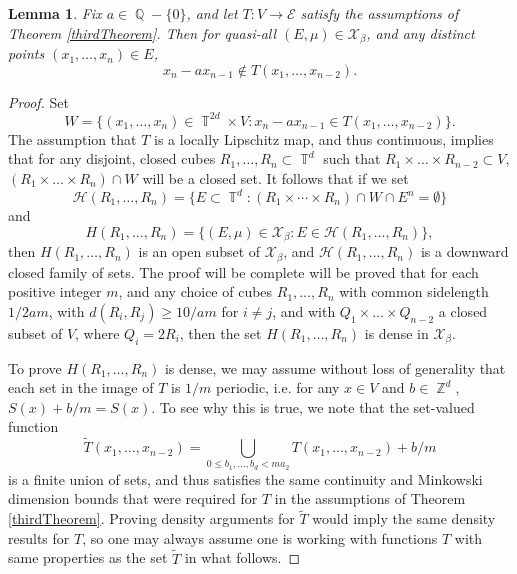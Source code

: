 \documentclass[dvipsnames,letterpaper,12pt]{article}
\numberwithin{equation}{section}
\DeclareMathOperator{\ZZ}{\mathbb{Z}}
\DeclareMathOperator{\QQ}{\mathbb{Q}}
\DeclareMathOperator{\TT}{\mathbb{T}}
\newtheorem{lemma}[theorem]{Lemma}
\numberwithin{theorem}{section}
\begin{document}
\begin{lemma}
    Fix $a \in \QQ - \{ 0 \}$, and let $T: V \to \mathcal{E}$ satisfy the assumptions of Theorem \ref{thirdTheorem}. Then for quasi-all $(E,\mu) \in \mathcal{X}_\beta$, and any distinct points $(x_1,\dots,x_n) \in E$,
    \[ x_n - ax_{n-1} \not \in T(x_1,\dots,x_{n-2}). \]
\end{lemma}
\begin{proof}
    Set
    \[ W = \{ (x_1,\dots,x_n) \in \TT^{2d} \times V : x_n - ax_{n-1} \in T(x_1,\dots,x_{n-2}) \}. \]
    The assumption that $T$ is a locally Lipschitz map, and thus continuous, implies that for any disjoint, closed cubes $R_1,\dots,R_n \subset \TT^d$ such that $R_1 \times \dots \times R_{n-2} \subset V$, $(R_1 \times \dots \times R_n) \cap W$ will be a closed set. It follows that if we set
    \[ \mathcal{H}(R_1,\dots,R_n) = \{ E \subset \TT^d : (R_1 \times \cdots \times R_n) \cap W \cap E^n = \emptyset \} \]
    and
    \[ H(R_1,\dots,R_n) = \{ (E,\mu) \in \mathcal{X}_\beta: E \in \mathcal{H}(R_1,\dots,R_n) \}, \]
    then $H(R_1,\dots,R_n)$ is an open subset of $\mathcal{X}_\beta$, and $\mathcal{H}(R_1,\dots,R_n)$ is a downward closed family of sets. The proof will be complete will be proved that for each positive integer $m$, and any choice of cubes $R_1,\dots,R_n$ with common sidelength $1/2am$, with $d(R_i,R_j) \geq 10/am$ for $i \neq j$, and with $Q_1 \times \dots \times Q_{n-2}$ a closed subset of $V$, where $Q_i = 2R_i$, then the set $H(R_1,\dots,R_n)$ is dense in $\mathcal{X}_\beta$.

    To prove $H(R_1,\dots,R_n)$ is dense, we may assume without loss of generality that each set in the image of $T$ is $1/m$ periodic, i.e. for any $x \in V$ and $b \in \ZZ^d$, $S(x) + b/m = S(x)$. To see why this is true, we note that the set-valued function
    \[ \tilde{T}(x_1,\dots,x_{n-2}) = \bigcup_{0 \leq b_1,\dots,b_d < m a_2} T(x_1,\dots,x_{n-2}) + b/m \]
    is a finite union of sets, and thus satisfies the same continuity and Minkowski dimension bounds that were required for $T$ in the assumptions of Theorem \ref{thirdTheorem}. Proving density arguments for $\tilde{T}$ would imply the same density results for $T$, so one may always assume one is working with functions $T$ with same properties as the set $\tilde{T}$ in what follows.



\end{proof}
\end{document}
